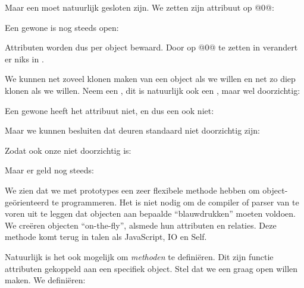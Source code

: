 
Maar een  moet natuurlijk gesloten zijn. We zetten zijn attribuut  op @0@:


Een gewone  is nog steeds open:


Attributen worden dus per object bewaard. Door  op @0@ te zetten in  verandert er niks in .

We kunnen net zoveel klonen maken van een object als we willen en net zo diep klonen als we willen. Neem een , dit is natuurlijk ook een , maar wel doorzichtig:


Een gewone  heeft het attribuut  niet, en dus een  ook niet:


Maar we kunnen besluiten dat deuren standaard niet doorzichtig zijn:


Zodat ook onze  niet doorzichtig is:


Maar er geld nog steeds:


We zien dat we met prototypes een zeer flexibele methode hebben om object-geörienteerd te programmeren. Het is niet nodig om de compiler of parser van te voren uit te leggen dat objecten aan bepaalde ``blauwdrukken'' moeten voldoen. We creëren objecten ``on-the-fly'', alsmede hun attributen en relaties. Deze methode komt terug in talen als JavaScript, IO en Self.

Natuurlijk is het ook mogelijk om \emph{methoden} te definiëren. Dit zijn functie attributen gekoppeld aan een specifiek object. Stel dat we een  graag open willen maken. We definiëren:

